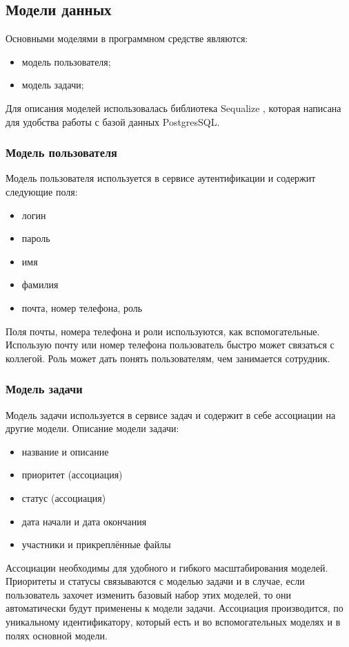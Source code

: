 \subsection{Модели данных}

Основными моделями в программном средстве {\taskNameFull} являются:
\begin{itemize}
    \item модель пользователя;
    \item модель задачи;
\end{itemize}

Для описания моделей использовалась библиотека Sequalize \cite{sequalizeDocs}, которая написана для удобства работы с базой данных PostgresSQL.

\subsubsection{Модель пользователя}

Модель пользователя используется в сервисе аутентификации и содержит следующие поля:
\begin{itemize}
    \item логин
    \item пароль
    \item имя
    \item фамилия
    \item почта, номер телефона, роль
\end{itemize}

Поля почты, номера телефона и роли используются, как вспомогательные. Использую почту или номер телефона пользователь быстро может
связаться с коллегой. Роль может дать понять пользователям, чем занимается сотрудник.

\subsubsection{Модель задачи}

Модель задачи используется в сервисе задач и содержит в себе ассоциации на другие модели.
Описание модели задачи:
\begin{itemize}
    \item название и описание
    \item приоритет (ассоциация)
    \item статус (ассоциация)
    \item дата начали и дата окончания
    \item участники и прикреплённые файлы
\end{itemize}

Ассоциации необходимы для удобного и гибкого масштабирования моделей. Приоритеты и статусы связываются с моделью задачи и в случае, если
пользователь захочет изменить базовый набор этих моделей, то они автоматически будут применены к модели задачи. Ассоциация производится, по
уникальному идентификатору, который есть и во вспомогательных моделях и в полях основной модели.